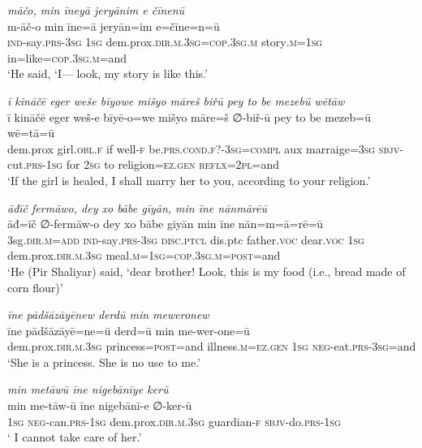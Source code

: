 \ea \label{ZP.98}
\textit{māčo, min īneyā jeryānim e čīnenū} \\ 
\gll m-āč-o min īne=ā jeryān=im e=čīne=n=ū \\ 
 \textsc{ind-}say\textsc{.prs}\textsc{-3sg} \textsc{1sg} dem.prox\textsc{.dir}\textsc{.m}\textsc{.3sg}\textsc{=cop}\textsc{.3sg}\textsc{.m} story\textsc{.m}\textsc{=\textsc{1sg}} in=like\textsc{=cop}\textsc{.3sg}\textsc{.m}=and \\ 
\glt `He said, ‘I— look, my story is like this.'
\z 
 
\ea \label{ZP.100}
\textit{ī kināčē eger weše bīyowe mišyo māreš biřū pey to be mezebū wētāw} \\ 
\gll ī kināčē eger weš-e bīyē-o=we mišyo māre=š ∅-biř-ū pey to be mezeb=ū wē=tā=ū \\ 
 dem.prox girl\textsc{.obl}\textsc{.f} if well\textsc{-f} be\textsc{.prs}.\textsc{cond}\textsc{.f}?\textsc{-3sg}\textsc{=compl} aux marraige\textsc{=3sg} \textsc{sbjv-}cut\textsc{.prs}\textsc{-\textsc{1sg}} for \textsc{2sg} to religion\textsc{\textsc{=ez.gen}} \textsc{reflx}=\textsc{2pl}=and \\ 
\glt `If the girl is healed, I shall marry her to you, according to your religion.'
\z 
 
\ea \label{ZP.101}
\textit{āđīč fermāwo, dey xo bābe gīyān, min īne nānmārēū} \\ 
\gll āđ=īč ∅-fermāw-o dey xo bābe gīyān min īne nān=m=ā=rē=ū \\ 
 3sg\textsc{.dir}\textsc{.m}\textsc{=add} \textsc{ind-}say\textsc{.prs}\textsc{-3sg} \textsc{disc.ptcl} dis.ptc father.\textsc{voc} dear.\textsc{voc} \textsc{1sg} dem.prox\textsc{.dir}\textsc{.m}\textsc{.3sg} meal\textsc{.m}\textsc{=\textsc{1sg}}\textsc{=cop}\textsc{.3sg}\textsc{.m}\textsc{=\textsc{post}}=and \\ 
\glt `He (Pir Shaliyar) said, ‘dear brother! Look, this is my food (i.e., bread made of corn flour)'
\z 
 
\ea \label{ZP.102}
\textit{īne pādšāzāyēnew derdū min meweronew} \\ 
\gll īne pādšāzāyē=ne=ū derd=ū min me-wer-one=ū \\ 
 dem.prox\textsc{.dir}\textsc{.m}\textsc{.3sg} princess\textsc{=\textsc{post}}=and illness\textsc{.m}\textsc{\textsc{=ez.gen}} \textsc{1sg} \textsc{neg-}eat\textsc{.prs}\textsc{-3sg}=and \\ 
\glt `She is a princess. She is no use to me.'
\z 
 
\ea \label{ZP.103}
\textit{min metāwū īne nigebānīye kerū} \\ 
\gll min me-tāw-ū īne nigebānī-e ∅-ker-ū \\ 
 \textsc{1sg} \textsc{neg-}can\textsc{.prs}\textsc{-\textsc{1sg}} dem.prox\textsc{.dir}\textsc{.m}\textsc{.3sg} guardian\textsc{-f} \textsc{sbjv-}do\textsc{.prs}\textsc{-\textsc{1sg}} \\ 
\glt ` I cannot take care of her.'
\z 
 
